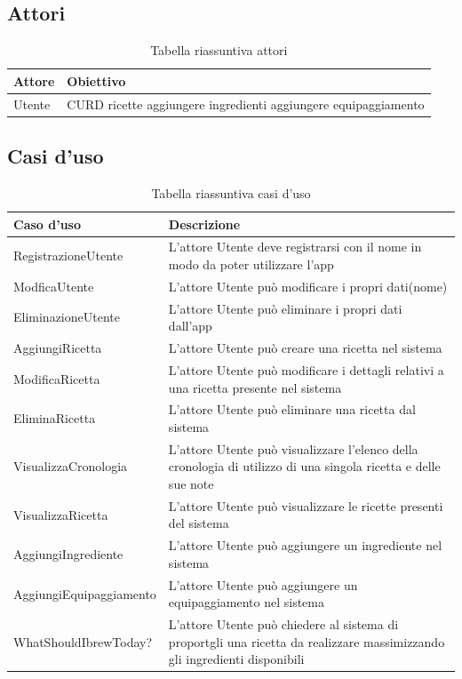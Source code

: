 \documentclass[12pt]{article}
\begin{document}
\subsection{Attori}

\begin{table}[H]
\centering
\begin{tabular}{l|p{6cm}}
Attore & Obiettivo \\
\hline\hline
Utente & CURD ricette \newline
aggiungere ingredienti \newline
aggiungere equipaggiamento \\
\end{tabular}
\caption{\label{tab:widgets}Tabella riassuntiva attori}
\end{table}


\subsection{Casi d'uso}

\begin{table}[H] %

\centering
\begin{tabular}{l|p{10cm}}%
Caso d'uso & Descrizione \\
\hline\hline
RegistrazioneUtente & L'attore Utente deve registrarsi con il nome in modo da poter utilizzare l'app \\
\hline
ModficaUtente & L'attore Utente può modificare i propri dati(nome) \\
\hline
EliminazioneUtente & L'attore Utente può eliminare i propri dati dall'app \\
\hline
AggiungiRicetta & L'attore Utente può creare una ricetta nel sistema \\
\hline
ModificaRicetta & L'attore Utente può modificare i dettagli relativi a una ricetta presente nel sistema \\
\hline
EliminaRicetta & L'attore Utente può eliminare una ricetta dal sistema \\
\hline
VisualizzaCronologia & L'attore Utente può visualizzare l'elenco della cronologia di utilizzo di una singola ricetta e delle sue note \\
\hline
VisualizzaRicetta & L'attore Utente può visualizzare le ricette presenti del sistema \\
\hline
AggiungiIngrediente & L'attore Utente può aggiungere un ingrediente nel sistema \\
\hline
AggiungiEquipaggiamento & L'attore Utente può aggiungere un equipaggiamento nel sistema \\
\hline
WhatShouldIbrewToday? & L'attore Utente può chiedere al sistema di proportgli una ricetta da realizzare massimizzando gli ingredienti disponibili \\
\end{tabular}
\caption{\label{tab:widgets}Tabella riassuntiva casi d'uso}
\end{table}
\end{document}
